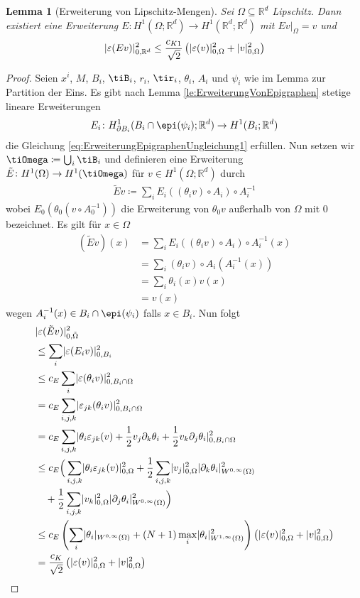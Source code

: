 \documentclass{scrartcl}
\newcounter{everything}
\newtheorem{lemma}[everything]{Lemma}
\def\R{\mathbb{R}}
\def\e{\varepsilon}
\DeclarePairedDelimiter{\abs}{|}{|}
\begin{document}
\begin{lemma}[Erweiterung von Lipschitz-Mengen]
	Sei $\Omega\subseteq\R^d$ Lipschitz. Dann existiert eine Erweiterung $E\colon H^1(\Omega;\R^d)\to H^1(\R^d;\R^d)$ mit $Ev\vert_\Omega = v$ und
	\begin{align*}
		\abs{\e(Ev)}_{0,\R^d}^2 \leq \frac{c_{K1}}{\sqrt{2}}\left(\abs{\e(v)}_{0,\Omega}^2+\abs{v}_{0,\Omega}^2\right)
	\end{align*}
\end{lemma}
\begin{proof}
	Seien $x^{i}$, $M$, $B_i$, $\tiB_i$, $r_i$, $\tir_i$, $\theta_i$, $A_i$ und $\psi_i$ wie im Lemma zur Partition der Eins.
	Es gibt nach Lemma \ref{le:ErweiterungVonEpigraphen} stetige lineare Erweiterungen
	\begin{align*}
		E_i\colon H^1_{\partial B_i}(B_i\cap\epi(\psi_i);\R^d)\to H^1(B_i;\R^d)
	\end{align*}
	die Gleichung \eqref{eq:ErweiterungEpigraphenUngleichung1} erfüllen.
	Nun setzen wir $\tiOmega\coloneqq\bigcup_i\tiB_i$ und definieren eine Erweiterung $\tilde{E}\colon H^1(\Omega)\to H^1(\tiOmega)$ für $v\in H^1(\Omega;\R^d)$ durch
	\begin{align*}
		\tilde{E}v \coloneqq\sum_iE_i((\theta_iv)\circ A_i)\circ A_i^{-1}
	\end{align*}
	wobei $E_0(\theta_0(v\circ A_0^{-1}))$ die Erweiterung von $\theta_0v$ außerhalb von $\Omega$ mit $0$ bezeichnet. Es gilt für $x\in\Omega$
	\begin{align*}
		(\tilde{E}v)(x) 
		&=\sum_iE_i((\theta_iv)\circ A_i)\circ A_i^{-1}(x) \\
		&= \sum_i(\theta_iv)\circ A_i(A_i^{-1}(x)) \\
		&= \sum_i\theta_i(x)v(x) \\
		&= v(x)
	\end{align*}
	wegen $A_i^{-1}(x)\in B_i\cap\epi(\psi_i)$ falls $x\in B_i$.
	Nun folgt
	\begin{align*}
		&\abs{\e(\tilde{E}v)}_{0,\tilde{\Omega}}^2 \\
		&\leq \sum_i\abs{\e(E_iv)}_{0,B_i}^2 \\
		&\leq c_E\sum_i\abs{\e(\theta_iv)}_{0,B_i\cap\Omega}^2 \\
		&=c_E\sum_{i,j,k}\abs{\e_{jk}(\theta_iv)}_{0,B_i\cap\Omega}^2 \\
		&=c_E\sum_{i,j,k}\abs{\theta_i\e_{jk}(v)+\frac{1}{2}v_j\partial_k\theta_i + \frac{1}{2}v_k\partial_j\theta_i}_{0,B_i\cap\Omega}^2 \\
		&\leq c_E\Big(\sum_{i,j,k}\abs{\theta_i\e_{jk}(v)}_{0,\Omega}^2+\frac{1}{2}\sum_{i,j,k}\abs{v_j}_{0,\Omega}^2\abs{\partial_k\theta_i}_{W^{0,\infty}(\Omega)}^2 \\
		&\quad+\frac{1}{2}\sum_{i,j,k}\abs{v_k}_{0,\Omega}^2\abs{\partial_j\theta_i}_{W^{0,\infty}(\Omega)}^2\Big) \\
		&\leq c_E\left(\sum_i\abs{\theta_i}_{W^{0,\infty}(\Omega)}+(N+1)\max_i\abs{\theta_i}_{W^{1,\infty}(\Omega)}^2\right)\left(\abs{\e(v)}_{0,\Omega}^2 + \abs{v}_{0,\Omega}^2\right) \\
		&=\frac{c_K}{\sqrt{2}}\left(\abs{\e(v)}_{0,\Omega}^2+\abs{v}_{0,\Omega}^2\right)
	\end{align*}
\end{proof}
\end{document}
